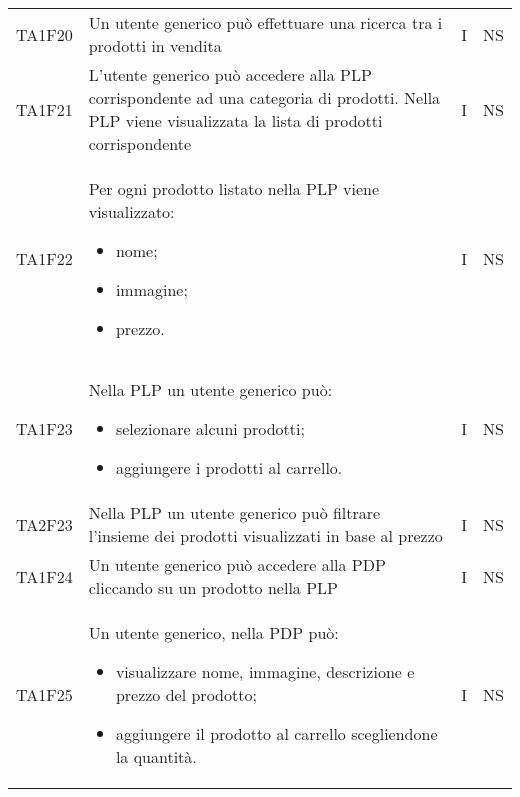 {\begin{longtable}{C{2cm} C{9.6cm} C{1.5cm} C{1cm}}
TA1F20 & Un utente generico può effettuare una ricerca tra i prodotti in vendita & I & NS\\

TA1F21 & L'utente generico può accedere alla PLP corrispondente ad una categoria di prodotti. Nella PLP viene visualizzata la lista di prodotti corrispondente & I & NS\\

TA1F22 & Per ogni prodotto listato nella PLP viene visualizzato:
\begin{itemize}
	\item nome;
	\item immagine;
	\item prezzo.
\end{itemize} & I & NS\\

TA1F23 & Nella PLP un utente generico può:
\begin{itemize}
	\item selezionare alcuni prodotti;
	\item aggiungere i prodotti al carrello.
\end{itemize} & I & NS\\

TA2F23 & Nella PLP un utente generico può filtrare l'insieme dei prodotti visualizzati in base al prezzo & I & NS\\

TA1F24 & Un utente generico può accedere alla PDP cliccando su un prodotto nella PLP & I & NS\\

TA1F25 & Un utente generico, nella PDP può:
\begin{itemize}
	\item visualizzare nome, immagine, descrizione e prezzo del prodotto;
	\item aggiungere il prodotto al carrello scegliendone la quantità.
\end{itemize} & I & NS\\



\end{longtable}


}